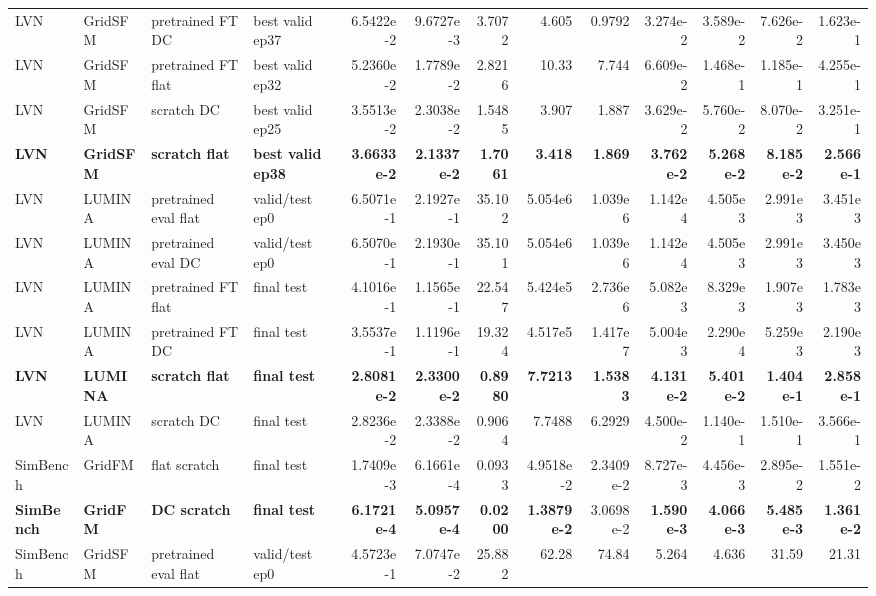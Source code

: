 \documentclass[10pt]{article}
\begin{document}
\begin{landscape}
\begin{table}[p]
{\begin{tabular}{llllrrrrrrrrr}
LVN & GridSFM & pretrained FT DC & best valid ep37 & 6.5422e-2 & 9.6727e-3 & 3.7072 & 4.605 & 0.9792 & 3.274e-2 & 3.589e-2 & 7.626e-2 & 1.623e-1 \\
LVN & GridSFM & pretrained FT flat & best valid ep32 & 5.2360e-2 & 1.7789e-2 & 2.8216 & 10.33 & 7.744 & 6.609e-2 & 1.468e-1 & 1.185e-1 & 4.255e-1 \\
LVN & GridSFM & scratch DC & best valid ep25 & 3.5513e-2 & 2.3038e-2 & 1.5485 & 3.907 & 1.887 & 3.629e-2 & 5.760e-2 & 8.070e-2 & 3.251e-1 \\
\textbf{LVN} & \textbf{GridSFM} & \textbf{scratch flat} & \textbf{best valid ep38} & \textbf{3.6633e-2} & \textbf{2.1337e-2} & \textbf{1.7061} & \textbf{3.418} & \textbf{1.869} & \textbf{3.762e-2} & \textbf{5.268e-2} & \textbf{8.185e-2} & \textbf{2.566e-1} \\
LVN & LUMINA & pretrained eval flat & valid/test ep0 & 6.5071e-1 & 2.1927e-1 & 35.102 & 5.054e6 & 1.039e6 & 1.142e4 & 4.505e3 & 2.991e3 & 3.451e3 \\
LVN & LUMINA & pretrained eval DC & valid/test ep0 & 6.5070e-1 & 2.1930e-1 & 35.101 & 5.054e6 & 1.039e6 & 1.142e4 & 4.505e3 & 2.991e3 & 3.450e3 \\
LVN & LUMINA & pretrained FT flat & final test & 4.1016e-1 & 1.1565e-1 & 22.547 & 5.424e5 & 2.736e6 & 5.082e3 & 8.329e3 & 1.907e3 & 1.783e3 \\
LVN & LUMINA & pretrained FT DC & final test & 3.5537e-1 & 1.1196e-1 & 19.324 & 4.517e5 & 1.417e7 & 5.004e3 & 2.290e4 & 5.259e3 & 2.190e3 \\
\textbf{LVN} & \textbf{LUMINA} & \textbf{scratch flat} & \textbf{final test} & \textbf{2.8081e-2} & \textbf{2.3300e-2} & \textbf{0.8980} & \textbf{7.7213} & \textbf{1.5383} & \textbf{4.131e-2} & \textbf{5.401e-2} & \textbf{1.404e-1} & \textbf{2.858e-1} \\
LVN & LUMINA & scratch DC & final test & 2.8236e-2 & 2.3388e-2 & 0.9064 & 7.7488 & 6.2929 & 4.500e-2 & 1.140e-1 & 1.510e-1 & 3.566e-1 \\
SimBench & GridFM & flat scratch & final test & 1.7409e-3 & 6.1661e-4 & 0.0933 & 4.9518e-2 & 2.3409e-2 & 8.727e-3 & 4.456e-3 & 2.895e-2 & 1.551e-2 \\
\textbf{SimBench} & \textbf{GridFM} & \textbf{DC scratch} & \textbf{final test} & \textbf{6.1721e-4} & \textbf{5.0957e-4} & \textbf{0.0200} & \textbf{1.3879e-2} & 3.0698e-2 & \textbf{1.590e-3} & \textbf{4.066e-3} & \textbf{5.485e-3} & \textbf{1.361e-2} \\
SimBench & GridSFM & pretrained eval flat & valid/test ep0 & 4.5723e-1 & 7.0747e-2 & 25.882 & 62.28 & 74.84 & 5.264 & 4.636 & 31.59 & 21.31 \\

\end{tabular}}
\end{table}
\end{landscape}
\end{document}
